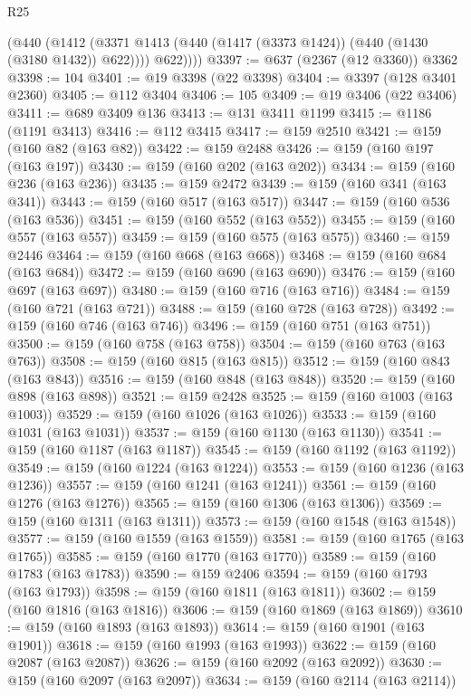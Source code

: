\begin{lexlean}{R25}
\begin{coremodule}
{{{{{{{{{{{{{{{{{{{{{{{{{{{{{{{{{{{{{{{{{{{{{{{{{{{{{{{{{{{{{{{{{{{{{{{{{{{{{{{{{{{{{{{{{{{{{{{{{{{{{{{{{{{{{{{{{{{{{{{{{{{{{{{{{{{{{{{{{{{{{{{{{{{{{{{{{{{{{{{{{{{{{{{{{{{{{{{{{{{{{{{{{{{{{{{{{{{{{{{          (@440
            (@1412 (@3371 @1413 (@440 (@1417 (@3373 @1424)) (@440 (@1430 (@3180 @1432)) @622))))
            @622))))
@3397 := @637 (@2367 (@12 @3360)) @3362
@3398 := 104
@3401 := @19 @3398 (@22 @3398)
@3404 := @3397 (@128 @3401 @2360)
@3405 := @112 @3404
@3406 := 105
@3409 := @19 @3406 (@22 @3406)
@3411 := @689 @3409 @136
@3413 := @131 @3411 @1199
@3415 := @1186 (@1191 @3413)
@3416 := @112 @3415
@3417 := @159 @2510
@3421 := @159 (@160 @82 (@163 @82))
@3422 := @159 @2488
@3426 := @159 (@160 @197 (@163 @197))
@3430 := @159 (@160 @202 (@163 @202))
@3434 := @159 (@160 @236 (@163 @236))
@3435 := @159 @2472
@3439 := @159 (@160 @341 (@163 @341))
@3443 := @159 (@160 @517 (@163 @517))
@3447 := @159 (@160 @536 (@163 @536))
@3451 := @159 (@160 @552 (@163 @552))
@3455 := @159 (@160 @557 (@163 @557))
@3459 := @159 (@160 @575 (@163 @575))
@3460 := @159 @2446
@3464 := @159 (@160 @668 (@163 @668))
@3468 := @159 (@160 @684 (@163 @684))
@3472 := @159 (@160 @690 (@163 @690))
@3476 := @159 (@160 @697 (@163 @697))
@3480 := @159 (@160 @716 (@163 @716))
@3484 := @159 (@160 @721 (@163 @721))
@3488 := @159 (@160 @728 (@163 @728))
@3492 := @159 (@160 @746 (@163 @746))
@3496 := @159 (@160 @751 (@163 @751))
@3500 := @159 (@160 @758 (@163 @758))
@3504 := @159 (@160 @763 (@163 @763))
@3508 := @159 (@160 @815 (@163 @815))
@3512 := @159 (@160 @843 (@163 @843))
@3516 := @159 (@160 @848 (@163 @848))
@3520 := @159 (@160 @898 (@163 @898))
@3521 := @159 @2428
@3525 := @159 (@160 @1003 (@163 @1003))
@3529 := @159 (@160 @1026 (@163 @1026))
@3533 := @159 (@160 @1031 (@163 @1031))
@3537 := @159 (@160 @1130 (@163 @1130))
@3541 := @159 (@160 @1187 (@163 @1187))
@3545 := @159 (@160 @1192 (@163 @1192))
@3549 := @159 (@160 @1224 (@163 @1224))
@3553 := @159 (@160 @1236 (@163 @1236))
@3557 := @159 (@160 @1241 (@163 @1241))
@3561 := @159 (@160 @1276 (@163 @1276))
@3565 := @159 (@160 @1306 (@163 @1306))
@3569 := @159 (@160 @1311 (@163 @1311))
@3573 := @159 (@160 @1548 (@163 @1548))
@3577 := @159 (@160 @1559 (@163 @1559))
@3581 := @159 (@160 @1765 (@163 @1765))
@3585 := @159 (@160 @1770 (@163 @1770))
@3589 := @159 (@160 @1783 (@163 @1783))
@3590 := @159 @2406
@3594 := @159 (@160 @1793 (@163 @1793))
@3598 := @159 (@160 @1811 (@163 @1811))
@3602 := @159 (@160 @1816 (@163 @1816))
@3606 := @159 (@160 @1869 (@163 @1869))
@3610 := @159 (@160 @1893 (@163 @1893))
@3614 := @159 (@160 @1901 (@163 @1901))
@3618 := @159 (@160 @1993 (@163 @1993))
@3622 := @159 (@160 @2087 (@163 @2087))
@3626 := @159 (@160 @2092 (@163 @2092))
@3630 := @159 (@160 @2097 (@163 @2097))
@3634 := @159 (@160 @2114 (@163 @2114))
}}}}}}}}}}}}}}}}}}}}}}}}}}}}}}}}}}}}}}}}}}}}}}}}}}}}}}}}}}}}}}}}}}}}}}}}}}}}}}}}}}}}}}}}}}}}}}}}}}}}}}}}}}}}}}}}}}}}}}}}}}}}}}}}}}}}}}}}}}}}}}}}}}}}}}}}}}}}}}}}}}}}}}}}}}}}}}}}}}}}}}}}}}}}}}}}}}}}}}}
\end{coremodule}
\end{lexlean}
